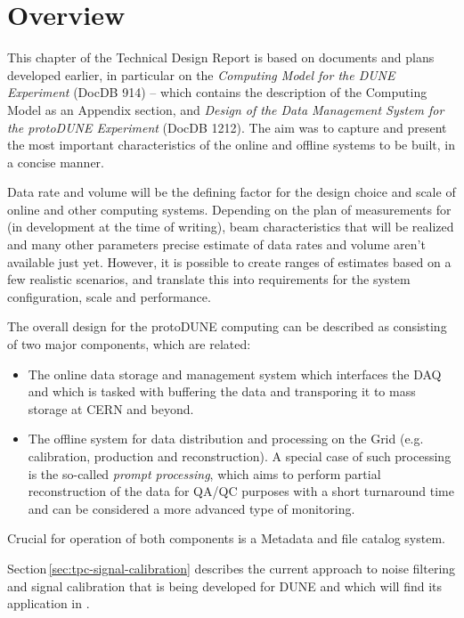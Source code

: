 \section{Overview}

This chapter of the Technical Design Report is based on documents and plans developed earlier, in particular
on the \textit{Computing Model for the DUNE Experiment} (DocDB 914) -- which contains the description
of the \pd Computing Model as an Appendix section, and \textit{Design of the Data Management System for the protoDUNE Experiment}
(DocDB 1212). The aim was to capture and present the most important characteristics of the online and offline systems to be built, in a concise manner.

Data rate and volume will be the defining factor for the design choice and scale of \pd online and other computing systems.
Depending on the plan of measurements for \pd
(in development at the time of writing), beam characteristics that will be realized
and many other parameters precise estimate of data rates and volume aren't available just yet. However, it is possible to create ranges
of estimates based on a few realistic scenarios, and translate this into requirements for the system configuration, scale and
performance.

The overall design for the protoDUNE computing can be described as consisting of two major components, which are related:
\begin{itemize}
\item The online data storage and management system which interfaces the DAQ and which is tasked with buffering
the data and transporing it to mass storage at CERN and beyond.
\item The offline system for data distribution and processing on the Grid (e.g. calibration, production and reconstruction). A special case
of such processing is the so-called \textit{prompt processing}, which aims to perform partial reconstruction of the data for QA/QC purposes
with a short turnaround time and can be considered a more advanced type of monitoring.
\end{itemize}

\noindent Crucial for operation of both components is a Metadata and file catalog system.

Section\,\ref{sec:tpc-signal-calibration} describes the current approach to noise filtering and signal calibration that is being
developed for DUNE and which will find its application in \pd.


